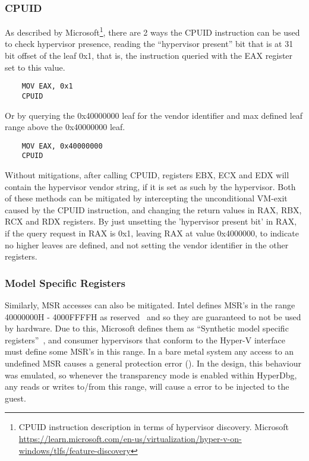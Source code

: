 \subsubsection{CPUID}
As described by Microsoft\footnote{CPUID instruction description in terms of hypervisor discovery. Microsoft \url{https://learn.microsoft.com/en-us/virtualization/hyper-v-on-windows/tlfs/feature-discovery}}, 
there are 2 ways the CPUID instruction can be used to check hypervisor presence, reading the “hypervisor present” bit that is at 31 bit offset of the leaf 0x1, that is, the instruction queried with the EAX register set to this value.
\begin{verbatim}
    MOV EAX, 0x1
    CPUID
\end{verbatim}
Or by querying the 0x40000000 leaf for the vendor identifier and max defined leaf range above the 0x40000000 leaf. 
\begin{verbatim}
    MOV EAX, 0x40000000
    CPUID
\end{verbatim}
Without mitigations, after calling CPUID, registers EBX, ECX and EDX will contain the hypervisor vendor string, if it is set as such by the hypervisor.
Both of these methods can be mitigated by intercepting the unconditional VM-exit caused by the CPUID instruction, and changing the return values in RAX, RBX, RCX and RDX registers. 
By just unsetting the 'hypervisor present bit' in RAX, if the query request in RAX is 0x1, leaving RAX at value 0x4000000, to indicate no higher leaves are defined, and not setting the vendor identifier in the other registers.

\subsubsection{Model Specific Registers}
Similarly, MSR accesses can also be mitigated. Intel defines MSR's in the range 40000000H - 4000FFFFH as reserved~\cite[Volume 4]{Intel-SDM2025} and so they are guaranteed to not be used by hardware. 
Due to this, Microsoft defines them as “Synthetic model specific registers”~\cite{microsoft_hv_interface_reqs}, and consumer hypervisors that conform to the Hyper-V  interface must define some MSR's in this range. 
In a bare metal system any access to an undefined MSR causes a general protection error (). In the design, this behaviour was emulated, 
so whenever the transparency mode is enabled within HyperDbg, any reads or writes to/from this range, will cause a  error to be injected to the guest.

